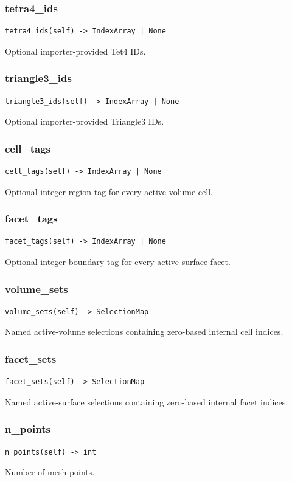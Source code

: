 \subsubsection*{tetra4\_ids}
\begin{lstlisting}
tetra4_ids(self) -> IndexArray | None
\end{lstlisting}
Optional importer-provided Tet4 IDs.
\subsubsection*{triangle3\_ids}
\begin{lstlisting}
triangle3_ids(self) -> IndexArray | None
\end{lstlisting}
Optional importer-provided Triangle3 IDs.
\subsubsection*{cell\_tags}
\begin{lstlisting}
cell_tags(self) -> IndexArray | None
\end{lstlisting}
Optional integer region tag for every active volume cell.
\subsubsection*{facet\_tags}
\begin{lstlisting}
facet_tags(self) -> IndexArray | None
\end{lstlisting}
Optional integer boundary tag for every active surface facet.
\subsubsection*{volume\_sets}
\begin{lstlisting}
volume_sets(self) -> SelectionMap
\end{lstlisting}
Named active-volume selections containing zero-based internal cell indices.
\subsubsection*{facet\_sets}
\begin{lstlisting}
facet_sets(self) -> SelectionMap
\end{lstlisting}
Named active-surface selections containing zero-based internal facet indices.
\subsubsection*{n\_points}
\begin{lstlisting}
n_points(self) -> int
\end{lstlisting}
Number of mesh points.
